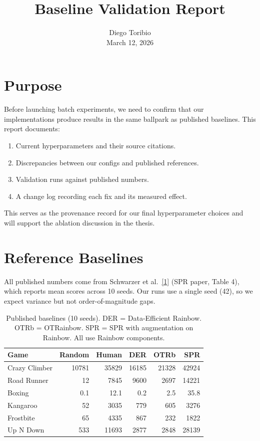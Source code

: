 \documentclass[11pt]{article}
\title{Baseline Validation Report}
\author{Diego Toribio\\[0.3em]{\normalsize March 12, 2026}}
\date{\vspace{-2.5em}}
\newcommand{\citelink}[2]{\href{#1}{\small[#2]}}
\begin{document}
\maketitle
\thispagestyle{empty}

\section{Purpose}

Before launching batch experiments, we need to confirm that our
implementations produce results in the same ballpark as published
baselines. This report documents:

\begin{enumerate}[leftmargin=2em, itemsep=0.3em]
  \item Current hyperparameters and their source citations.
  \item Discrepancies between our configs and published references.
  \item Validation runs against published numbers.
  \item A change log recording each fix and its measured effect.
\end{enumerate}

This serves as the provenance record for our final hyperparameter
choices and will support the ablation discussion in the thesis.

\section{Reference Baselines}

All published numbers come from Schwarzer et al.\
\citelink{https://arxiv.org/abs/2007.05929}{1} (SPR paper, Table 4),
which reports mean scores across 10 seeds. Our runs use a single seed
(42), so we expect variance but not order-of-magnitude gaps.

\begin{table}[H]
\centering
\small
\renewcommand{\arraystretch}{1.5}
\setlength{\tabcolsep}{5pt}
\begin{tabular}{l rrrrr}
\toprule
\textbf{Game} & \textbf{Random} & \textbf{Human}
  & \textbf{DER} & \textbf{OTRb} & \textbf{SPR} \\
\midrule
Crazy Climber & 10781 & 35829 & 16185 & 21328 & 42924 \\
Road Runner   & 12    & 7845  & 9600  & 2697  & 14221 \\
Boxing        & 0.1   & 12.1  & 0.2   & 2.5   & 35.8  \\
Kangaroo      & 52    & 3035  & 779   & 605   & 3276  \\
Frostbite     & 65    & 4335  & 867   & 232   & 1822  \\
Up N Down     & 533   & 11693 & 2877  & 2848  & 28139 \\
\bottomrule
\end{tabular}
\caption{Published baselines (10 seeds). DER = Data-Efficient
Rainbow. OTRb = OTRainbow. SPR = SPR with augmentation on Rainbow.
All use Rainbow components.}
\label{tab:published}
\end{table}
\end{document}
